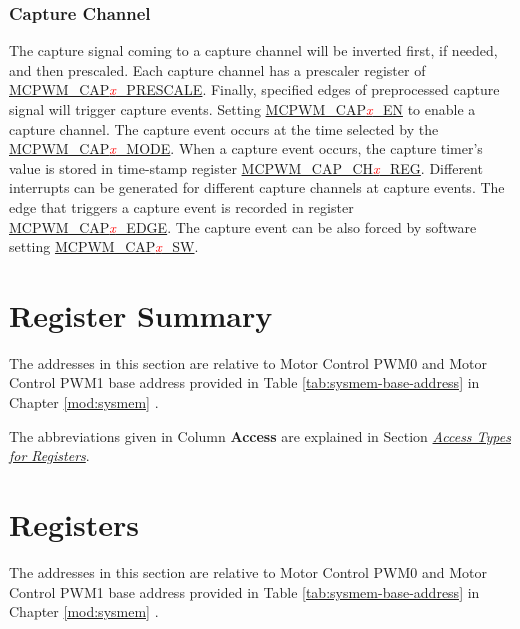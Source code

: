 \documentclass[main\_\_EN.tex]{subfiles}
\begin{document}
\subsubsection{Capture Channel}
The capture signal coming to a capture channel will be inverted first, if needed, and then prescaled. Each capture channel has a prescaler register of \hyperref[fielddesc:MCPWMCAP0PRESCALE]{MCPWM\_CAP\textcolor{red}{\it{x}}\_PRESCALE}. Finally, specified edges of preprocessed capture signal will trigger capture events. Setting \hyperref[fielddesc:MCPWMCAP0EN]{MCPWM\_CAP\textcolor{red}{\it{x}}\_EN} to enable a capture channel. The capture event occurs at the time selected by the \hyperref[fielddesc:MCPWMCAP0MODE]{MCPWM\_CAP\textcolor{red}{\it{x}}\_MODE}. When a capture event occurs, the capture timer's value is stored in time-stamp register \hyperref[regdesc:MCPWMCAPCH0REG]{MCPWM\_CAP\_CH\textcolor{red}{\it{x}}\_REG}. Different interrupts can be generated for different capture channels at capture events. The edge that triggers a capture event is recorded in register \hyperref[fielddesc:MCPWMCAP0EDGE]{MCPWM\_CAP\textcolor{red}{\it{x}}\_EDGE}. The capture event can be also forced by software setting \hyperref[fielddesc:MCPWMCAP0SW]{MCPWM\_CAP\textcolor{red}{\it{x}}\_SW}.





\clearpage
\hypertarget{mcpwm-reg-summ}{}
\section{Register Summary}
\label{sec:mcpwm-reg-summ}

The addresses in this section are relative to Motor Control PWM0 and Motor Control PWM1 base address provided in Table \ref{tab:sysmem-base-address} in Chapter \ref{mod:sysmem} \textit{}.

The abbreviations given in Column \textbf{Access} are explained in Section \hyperref[glossary-access-types]{\textit{Access Types for Registers}}.






\clearpage
\section{Registers}

The addresses in this section are relative to Motor Control PWM0 and Motor Control PWM1 base address provided in Table \ref{tab:sysmem-base-address} in Chapter \ref{mod:sysmem} \textit{}.


\end{document}
